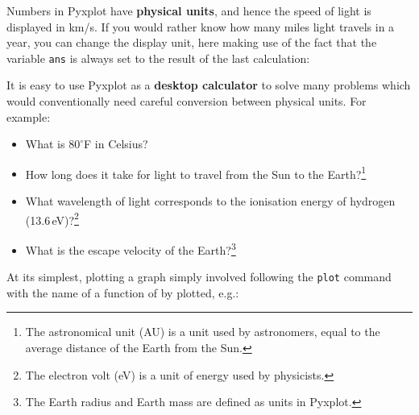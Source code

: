 \noindent Numbers in Pyxplot have {\bf physical units}, and hence the speed of
light is displayed in km/s. If you would rather know how many miles light
travels in a year, you can change the display unit, here making use of the fact
that the variable {\tt ans} is always set to the result of the last
calculation:

\vspace{3mm}

\vspace{3mm}

\noindent It is easy to use Pyxplot as a {\bf desktop calculator} to solve many
problems which would conventionally need careful conversion between physical
units. For example:

\begin{itemize}
\item What is $80^\circ$F in Celsius?

\vspace{3mm}

\vspace{3mm}

\item How long does it take for light to travel from the Sun to the
Earth?\footnote{The astronomical unit (AU) is a unit used by astronomers, equal
to the average distance of the Earth from the Sun.}

\vspace{3mm}

\vspace{3mm}

\item What wavelength of light corresponds to the ionisation energy of hydrogen
(13.6\,eV)?\footnote{The electron volt (eV) is a unit of energy used by
physicists.}

\vspace{3mm}

\vspace{3mm}

\item What is the escape velocity of the Earth?\footnote{The Earth radius and
Earth mass are defined as units in Pyxplot.}

\vspace{3mm}

\vspace{3mm}
\end{itemize}


At its simplest, plotting a graph simply involved following the {\tt plot}
command with the name of a function of by plotted, e.g.:

